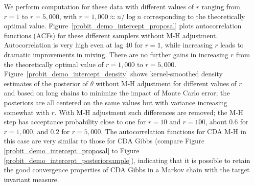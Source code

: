 \documentclass[12pt]{article}
\begin{document}
We perform computation for these data with different values of $r$ ranging from $r=1$ to $r=5,000$, with $r=1,000 \approx n/\log n$ corresponding to the theoretically optimal value.  Figure~\ref{probit_demo_intercept_proposal} plots autocorrelation functions (ACFs) for these different samplers without  M-H adjustment. Autocorrelation is very high even at lag 40 for $r=1$, while increasing $r$ leads to dramatic improvements in mixing. There are no further gains in increasing $r$ from the theoretically optimal value of $r=1,000$ to $r=5,000$. Figure~\ref{probit_demo_intercept_density} shows kernel-smoothed density estimates of the posterior of $\theta$ without M-H adjustment for different values of $r$ and based on long chains to minimize the impact of Monte Carlo error; the posteriors are all centered on the same values but with variance increasing somewhat with $r$.  With M-H adjustment such differences are removed; the M-H step has acceptance probability close to one for $r=10$ and $r=100$, about 0.6 for $r=1,000$, and 0.2 for $r=5,000$. The autocorrelation functions for CDA M-H in this case are very similar to those for CDA Gibbs (compare Figure \ref{probit_demo_intercept_proposal} to Figure \ref{probit_demo_intercept_posteriorsample}), indicating that it is possible to retain the good convergence properties of CDA Gibbs in a Markov chain with the target invariant measure.
\end{document}
